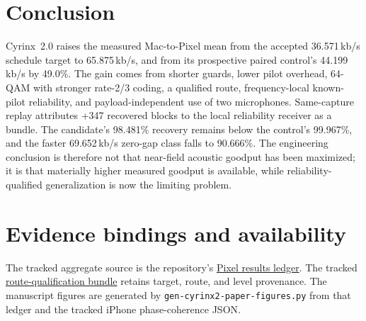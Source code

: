 \documentclass[11pt]{article}
\newcommand{\cyrtwo}{Cyrinx~2.0}
\begin{document}
\section{Conclusion}

\cyrtwo{} raises the measured Mac-to-Pixel mean from the accepted
36.571\,kb/s schedule target to 65.875\,kb/s, and from its prospective paired
control's 44.199\,kb/s by 49.0\%. The gain comes from shorter guards, lower
pilot overhead, 64-QAM with stronger rate-2/3 coding, a qualified route,
frequency-local known-pilot reliability, and payload-independent use of two
microphones. Same-capture replay attributes +347 recovered blocks to the local
reliability receiver as a bundle. The candidate's 98.481\% recovery remains
below the control's 99.967\%, and the faster 69.652\,kb/s zero-gap class falls
to 90.666\%. The engineering conclusion is therefore not that near-field
acoustic goodput has been maximized; it is that materially higher measured
goodput is available, while reliability-qualified generalization is now the
limiting problem.

\appendix
\section{Evidence bindings and availability}
\label{sec:evidence}

The tracked aggregate source is the repository's
\href{https://github.com/dweekly/cyrinx/blob/main/scratch/hw20k/evidence/pixel7a-cyrinx2-2026-07-17/results-ledger.json}{Pixel results ledger}.
The tracked
\href{https://github.com/dweekly/cyrinx/tree/main/scratch/hw20k/evidence/pixel7a-faceup-volume50-v1}{route-qualification bundle}
retains target, route, and level provenance. The manuscript figures are
generated by \texttt{gen-cyrinx2-paper-figures.py} from that ledger and the
tracked iPhone phase-coherence JSON.
\end{document}

